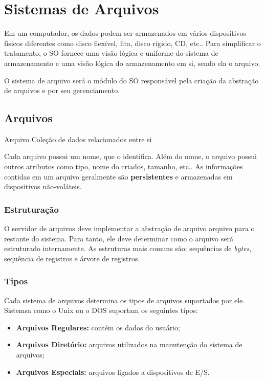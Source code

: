 \chapter{Sistemas de Arquivos}
Em um computador, os dados podem ser armazenados em vários dispositivos físicos diferentes como disco flexível, fita, disco rígido, CD, etc.. Para simplificar o tratamento, o SO fornece uma visão lógica e uniforme do sistema de armazenamento e uma visão lógica do armazenamento em si, sendo ela o arquivo.

O sistema de arquivo será o módulo do SO responsável pela criação da abstração de arquivos e por seu gerenciamento.

\section{Arquivos}

\begin{definicao}{Arquivo}
  Coleção de dados relacionados entre si
\end{definicao}

Cada arquivo possui um nome, que o identifica. Além do nome, o arquivo possui outros atributos como tipo, nome do criados, tamanho, etc.. As informações contidas em um arquivo geralmente são \textbf{persistentes} e armazenadas em dispositivos não-voláteis.

\subsection{Estruturação}
O servidor de arquivos deve implementar a abstração de arquivo arquivo para o restante do sistema. Para tanto, ele deve determinar como o arquivo será estruturado internamente. As estruturas mais comuns são: sequências de \textit{bytes}, sequência de registros e árvore de registros.


\subsection{Tipos}
Cada sistema de arquivos determina os tipos de arquivos suportados por ele. Sistemsa como o Unix ou o DOS suportam os seguintes tipos:

\begin{itemize}
  \item \textbf{Arquivos Regulares:} contém os dados do usuário;
  \item \textbf{Arquivos Diretório:} arquivos utilizados na manutenção do sistema de arquivos;
  \item \textbf{Arquivos Especiais:} arquivos ligados a dispositivos de E/S.
\end{itemize}


